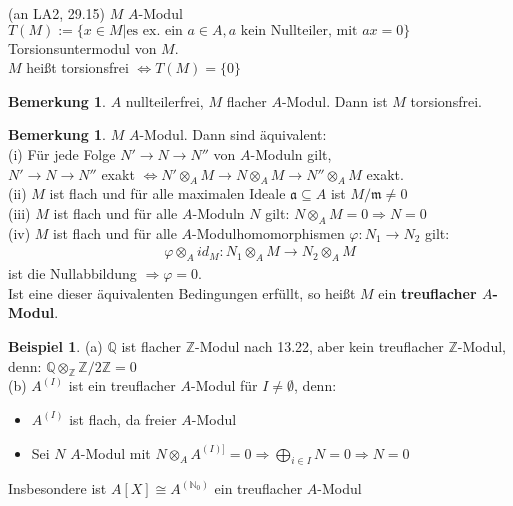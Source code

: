 \documentclass[10pt,a4paper,numbers=endperiod]{scrreprt}
\theoremstyle{definition}
\newtheorem{bem}[satz]{Bemerkung}
\newtheorem{bsp}[satz]{Beispiel}
\def\QQ{{\mathbb Q}}
\def\NN{{\mathbb N}}
\def\ZZ{{\mathbb Z}}
\begin{document}
 (an LA2, 29.15) $M$ $A$-Modul\\
$T(M) := \{x \in M| \text{es ex. ein } a \in A, a \text{ kein Nullteiler, mit } ax = 0\}$ Torsionsuntermodul von $M$.\\
$M$ heißt torsionsfrei $\Leftrightarrow T(M) = \{0\}$

\begin{bem}
	$A$ nullteilerfrei, $M$ flacher $A$-Modul. Dann ist $M$ torsionsfrei.
\end{bem}

\begin{bem}
	$M$ $A$-Modul. Dann sind äquivalent:\\
	(i) Für jede Folge $N' \to N \to N''$ von $A$-Moduln gilt,\\
	$N' \to N \to N''$ exakt $\Leftrightarrow N' \otimes_A M \to N \otimes_A M \to N'' \otimes_A M$ exakt.\\
	(ii) $M$ ist flach und für alle maximalen Ideale $\mathfrak{a} \subseteq A$ ist $M/\mathfrak{m} \neq 0$\\
	(iii) $M$ ist flach und für alle $A$-Moduln $N$ gilt: $N \otimes_A M = 0 \Rightarrow N = 0$\\
	(iv) $M$ ist flach und für alle $A$-Modulhomomorphismen $\varphi: N_1 \to N_2$ gilt:\begin{align*}
		\varphi \otimes_A id_M : N_1 \otimes_A M \to N_2 \otimes_A M
	\end{align*}
	ist die Nullabbildung $\Rightarrow \varphi = 0$.\\
	
	Ist eine dieser äquivalenten Bedingungen erfüllt, so heißt $M$ ein \textbf{treuflacher $A$-Modul}.
\end{bem}

\begin{bsp}
	(a) $\QQ$ ist flacher $\ZZ$-Modul nach 13.22, aber kein treuflacher $\ZZ$-Modul, denn: $\QQ \otimes_\ZZ \ZZ/2\ZZ = 0$\\
	(b) $A^{(I)}$ ist ein treuflacher $A$-Modul für $I \neq \emptyset$, denn: \begin{itemize}
		\item $A^{(I)}$ ist flach, da freier $A$-Modul
		\item Sei $N$ $A$-Modul mit $N \otimes_A A^{(I)]} = 0 \Rightarrow \bigoplus\limits_{i \in I} N = 0 \Rightarrow N = 0$
	\end{itemize}
	Insbesondere ist $A[X] \cong A^{(\NN_0)}$ ein treuflacher $A$-Modul
\end{bsp}
\end{document}
